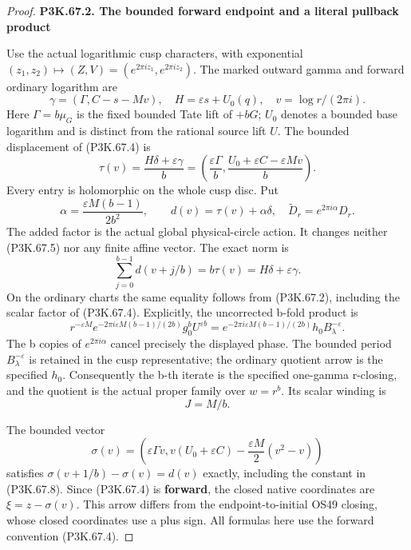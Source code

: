 \begin{proof}
\par

\medskip\noindent\textbf{P3K.67.2. The bounded forward endpoint and a literal pullback product}

\par\nobreak

Use the actual logarithmic cusp characters, with exponential
\((z_1,z_2)\mapsto(Z,V)=(e^{2\pi iz_1},e^{2\pi iz_2})\).
The marked outward gamma and forward ordinary logarithm are
\[
 \gamma=(\Gamma,C-s-Mv),\quad
 H=\varepsilon s+U_0(q),\quad v=\log r/(2\pi i).
\]
Here \(\Gamma=b\mu_G\) is the fixed bounded Tate lift of \(+bG\);
\(U_0\) denotes a bounded base logarithm and is distinct from the
rational source lift \(U\). The bounded displacement of (P3K.67.4) is
\[
 \tau(v)=\frac{H\delta+\varepsilon\gamma}{b}
   =\left(\frac{\varepsilon\Gamma}{b},
           \frac{U_0+\varepsilon C-\varepsilon Mv}{b}\right).
 \tag{P3K.67.7}
\]
Every entry is holomorphic on the whole cusp disc. Put
\[
 \alpha=\frac{\varepsilon M(b-1)}{2b^2},\qquad
 d(v)=\tau(v)+\alpha\delta,
 \quad \widetilde D_r=e^{2\pi i\alpha}D_r.
 \tag{P3K.67.8}
\]
The added factor is the actual global physical-circle action. It
changes neither (P3K.67.5) nor any finite affine vector. The exact norm is
\[
 \sum_{j=0}^{b-1}d(v+j/b)=b\tau(v)
                         =H\delta+\varepsilon\gamma.
 \tag{P3K.67.9}
\]
On the ordinary charts the same equality follows from (P3K.67.2), including
the scalar factor of (P3K.67.4). Explicitly, the uncorrected b-fold product
is
\[
 r^{-\varepsilon M}
 e^{-2\pi i\varepsilon M(b-1)/(2b)}
       g_0^bU^{\varepsilon b}
 =e^{-2\pi i\varepsilon M(b-1)/(2b)}h_0B_\lambda^{-\varepsilon}.
\]
The b copies of \(e^{2\pi i\alpha}\) cancel precisely the displayed
phase. The bounded period \(B_\lambda^{-\varepsilon}\) is retained in
the cusp representative; the ordinary quotient arrow is the specified
\(h_0\). Consequently the b-th iterate is the
specified one-gamma r-closing, and the quotient is the actual proper
family over \(w=r^b\). Its scalar winding is
\[
                         J=M/b.
 \tag{P3K.67.10}
\]

The bounded vector
\[
 \sigma(v)=\left(\varepsilon\Gamma v,
   v(U_0+\varepsilon C)-\frac{\varepsilon M}{2}(v^2-v)\right)
 \tag{P3K.67.11}
\]
satisfies \(\sigma(v+1/b)-\sigma(v)=d(v)\) exactly, including
the constant in (P3K.67.8). Since (P3K.67.4) is \textbf{forward}, the closed native
coordinates are \(\xi=z-\sigma(v)\). This arrow differs from the
endpoint-to-initial OS49 closing, whose closed coordinates use a plus
sign. All formulas here use the forward convention (P3K.67.4).


\end{proof}
